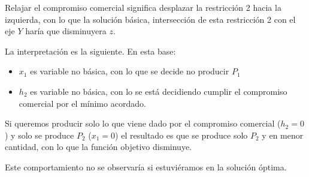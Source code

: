 \begin{enumerate}

    Relajar el compromiso comercial significa desplazar la restricción 2 hacia la izquierda, con lo que la solución básica, intersección de esta restricción 2 con el eje $Y$ haría que disminuyera $z$.

    La interpretación es la siguiente. En esta base:
    \begin{itemize}
        \item $x_1$ es variable no básica, con lo que se decide no producir $P_1$
        \item $h_2$ es variable no básica, con lo se está decidiendo cumplir el compromiso comercial por el mínimo acordado.
    \end{itemize}

    Si queremos producir solo lo que viene dado por el compromiso comercial ($h_2=0$) y solo se produce $P_2$ ($x_1=0$) el resultado es que se produce solo $P_2$ y en menor cantidad, con lo que la función objetivo disminuye.


    Este comportamiento no se observaría si estuviéramos en la solución óptima.



\end{enumerate}